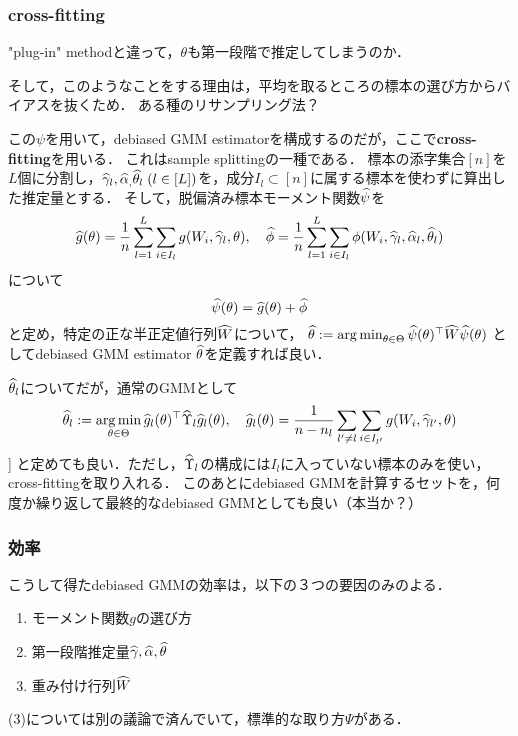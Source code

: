 \documentclass[uplatex,dvipdfmx]{jsreport}
\begin{document}
\subsubsection{cross-fitting}

\begin{tcolorbox}[colframe=ForestGreen, colback=ForestGreen!10!white,breakable,colbacktitle=ForestGreen!40!white,coltitle=black,fonttitle=\bfseries\sffamily,
title=]
    "plug-in" methodと違って，$\theta$も第一段階で推定してしまうのか．

    そして，このようなことをする理由は，平均を取るところの標本の選び方からバイアスを抜くため．
    ある種のリサンプリング法？
\end{tcolorbox}

この$\psi$を用いて，debiased GMM estimatorを構成するのだが，ここで\textbf{cross-fitting}を用いる．
これはsample splittingの一種である．
標本の添字集合$[n]$を$L$個に分割し，$\widehat{\gamma}_l,\widehat{\alpha}_,\widehat{\theta}_l\;(l\in[L])$を，成分$I_l\subset[n]$に属する標本を使わずに算出した推定量とする．
そして，脱偏済み標本モーメント関数$\widehat{\psi}$を
\[\widehat{g}(\theta)=\frac{1}{n}\sum^L_{l=1}\sum_{i\in I_l}g(W_i,\widehat{\gamma}_l,\theta),\quad\widehat{\phi}=\frac{1}{n}\sum^L_{l=1}\sum_{i\in I_l}\phi(W_i,\widehat{\gamma}_l,\widehat{\alpha}_l,\widehat{\theta}_l)\]
について
\[\widehat{\psi}(\theta)=\widehat{g}(\theta)+\widehat{\phi}\]
と定め，特定の正な半正定値行列$\widehat{W}$について，
$\widehat{\theta}:=\operatorname*{arg\,min}_{\theta\in\Theta}\widehat{\psi}(\theta)^\top\widehat{W}\widehat{\psi}(\theta)$
としてdebiased GMM estimator $\widehat{\theta}$を定義すれば良い．

\begin{remark}
    $\widehat{\theta}_l$についてだが，通常のGMMとして
    \[\widehat{\theta}_l:=\operatorname*{arg\,min}_{\theta\in\Theta}\widehat{g}_l(\theta)^\top\widehat{\Upsilon}_l\widehat{g}_l(\theta),\quad\widehat{g}_l(\theta)=\frac{1}{n-n_l}\sum_{l'\ne l}\sum_{i\in I_{l'}}g(W_i,\widehat{\gamma}_{l'},\theta)\]]
    と定めても良い．ただし，$\widehat{\Upsilon}_l$の構成には$I_l$に入っていない標本のみを使い，cross-fittingを取り入れる．
    このあとにdebiased GMMを計算するセットを，何度か繰り返して最終的なdebiased GMMとしても良い（本当か？）
\end{remark}

\subsubsection{効率}

こうして得たdebiased GMMの効率は，以下の３つの要因のみのよる．
\begin{enumerate}
    \item モーメント関数$g$の選び方
    \item 第一段階推定量$\widehat{\gamma},\widehat{\alpha},\widehat{\theta}$
    \item 重み付け行列$\widehat{W}$
\end{enumerate}
(3)については別の議論で済んでいて，標準的な取り方$\Psi$がある．
\end{document}
